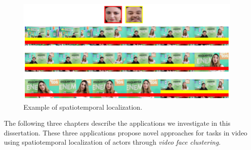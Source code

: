 \begin{figure}[!ht]
    \centering
    \includegraphics[width=0.85\linewidth]{img/face_clustering/example_localization.png}
    \caption{Example of spatiotemporal localization.}
    \label{fig:timeline}
\end{figure}

The following three chapters describe the applications we investigate in this dissertation. 
These three applications propose novel approaches for tasks in video using spatiotemporal localization of actors through \emph{video face clustering}.

